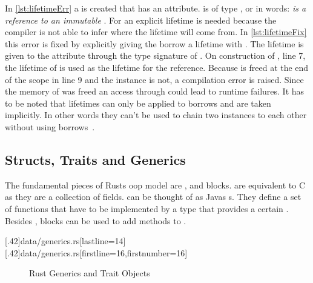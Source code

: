 \documentclass[thesis]{subfiles}
\begin{document}
    In \autoref{lst:lifetimeErr} a \struct \Foo is created that has an attribute.
     is of type , or in words: \emph{ is a reference to an immutable \String}.
    For  an explicit lifetime is needed because the compiler is not able to infer where the lifetime will come from.
    In \autoref{lst:lifetimeFix} this error is fixed by explicitly giving the borrow a lifetime with .
    The lifetime is given to the attribute through the type signature of \Foo.
    On construction of \Foo, line 7, the lifetime of  is used as the lifetime for the reference.
    Because  is freed at the end of the scope in line 9 and the \Foo instance is not, a compilation error is raised.
    Since the memory of  was freed an access through  could lead to runtime failures.
    It has to be noted that lifetimes can only be applied to borrows and are taken implicitly.
    In other words they can't be used to chain two instances to each other without using borrows~\autocite[PhantomData]{rust-doc}.

  \subsection{Structs, Traits and Generics}\label{sec:stg}
    The fundamental pieces of Rusts \gls{oop} model are \structs, \traits and  blocks.
    \structs are equivalent to C \structs as they are a collection of fields.
    \traits can be thought of as Javas s.
    They define a set of functions that have to be implemented by a type that provides a certain \trait.
    Besides \traits,  blocks can be used to add methods to \structs.

    \LstTikzBox{\genericsBase}[.42\linewidth]{data/generics.rs}[lastline=14]
    \LstTikzBox{\genericsCall}[.42\linewidth]{data/generics.rs}[firstline=16,firstnumber=16]
    \begin{figure}[ht]
      \captionsetup{type=lstlisting}
       \hfill%
      \caption{Rust Generics and Trait Objects}\label{lst:generics}
    \end{figure}
\end{document}
